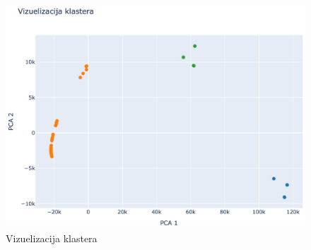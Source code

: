 \documentclass[a4paper,12pt]{article}
\begin{document}
\newpage
\begin{figure}[h!]
  \centering
  \includegraphics[width=1\textwidth]{slika23.jpeg}
  \caption{Vizuelizacija klastera}
  \label{fig:my_label}
\end{figure}
\end{document}

